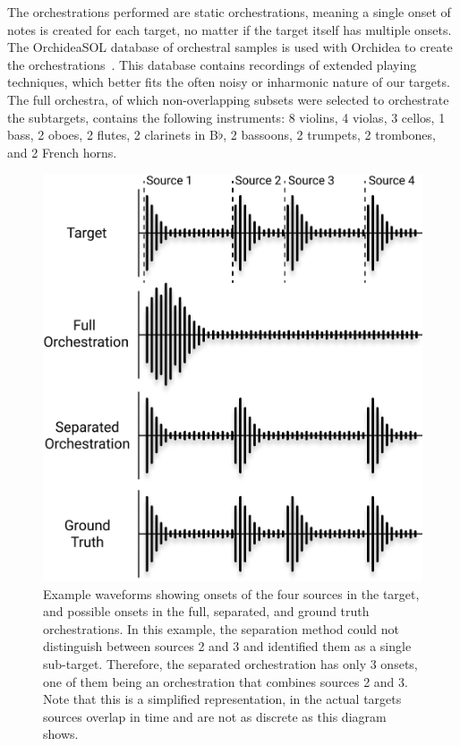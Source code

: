 \documentclass{article}
\begin{document}
		The orchestrations performed are static orchestrations, meaning a single onset of notes is created for each target, no matter if the target itself has multiple onsets. The OrchideaSOL database of orchestral samples is used with Orchidea to create the orchestrations~\cite{Cella2020c}. This database contains recordings of extended playing techniques, which better fits the often noisy or inharmonic nature of our targets. The full orchestra, of which non-overlapping subsets were selected to orchestrate the subtargets, contains the following instruments: 8 violins, 4 violas, 3 cellos, 1 bass, 2 oboes, 2 flutes, 2 clarinets in B$\flat$, 2 bassoons, 2 trumpets, 2 trombones, and 2 French horns.
		
		\begin{figure}[t]
		\centering
			\includegraphics[width=\columnwidth]{figures/orch.jpg}
			\caption{Example waveforms showing onsets of the four sources in the target, and possible onsets in the full, separated, and ground truth orchestrations. In this example, the separation method could not distinguish between sources 2 and 3 and identified them as a single sub-target. Therefore, the separated orchestration has only 3 onsets, one of them being an orchestration that combines sources 2 and 3. Note that this is a simplified representation, in the actual targets sources overlap in time and are not as discrete as this diagram shows.}\label{fig:orchestrations}
		\end{figure}		
		
\end{document}
